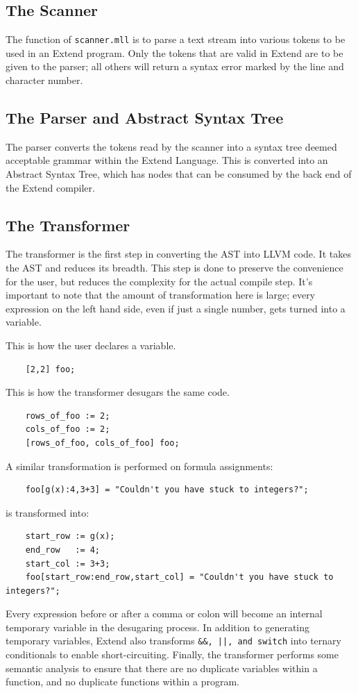   \subsection{The Scanner}
  The function of \texttt{scanner.mll} is to parse a text stream into various tokens to be used in an Extend program.
  Only the tokens that are valid in Extend are to be given to the parser; all others will return a syntax error marked by the line and character number.

  \subsection{The Parser and Abstract Syntax Tree}
  The parser converts the tokens read by the scanner into a syntax tree deemed acceptable grammar within the Extend Language. This is converted into an Abstract Syntax Tree, which has nodes that can be consumed by the back end of the Extend compiler.

  \subsection{The Transformer}
The transformer is the first step in converting the AST into LLVM code. It takes the AST and reduces its breadth. This step is done to preserve the convenience for the user, but reduces the complexity for the actual compile step. It's important to note that the amount of transformation here is large; every expression on the left hand side, even if just a single number, gets turned into a variable.

  \medskip \noindent This is how the user declares a variable.
  \begin{lstlisting}
    [2,2] foo;
  \end{lstlisting}

  \medskip \noindent This is how the transformer desugars the same code.
  \begin{lstlisting}
    rows_of_foo := 2;
    cols_of_foo := 2;
    [rows_of_foo, cols_of_foo] foo;
  \end{lstlisting}

  \medskip \noindent
  A similar transformation is performed on formula assignments:
  \begin{lstlisting}
    foo[g(x):4,3+3] = "Couldn't you have stuck to integers?";
  \end{lstlisting}
  is transformed into:
  \begin{lstlisting}
    start_row := g(x);
    end_row   := 4;
    start_col := 3+3;
    foo[start_row:end_row,start_col] = "Couldn't you have stuck to integers?";
  \end{lstlisting}
  Every expression before or after a comma or colon will become an internal temporary variable in the desugaring process. In addition to generating temporary variables, Extend also transforms \texttt{\&\&, ||, and switch} into ternary conditionals to enable short-circuiting. Finally, the transformer performs some semantic analysis to ensure that there are no duplicate variables within a function, and no duplicate functions within a program.

